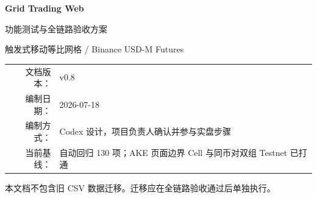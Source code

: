 \documentclass[11pt,a4paper,fontset=mac]{ctexart}
\begin{document}
\hypersetup{pageanchor=false}
\begin{titlepage}
  \centering
  \vspace*{3.5cm}
  {\Huge\bfseries Grid Trading Web\par}
  \vspace{0.7cm}
  {\LARGE 功能测试与全链路验收方案\par}
  \vspace{1.2cm}
  {\large 触发式移动等比网格 / Binance USD-M Futures\par}
  \vfill
  \begin{tabular}{rl}
    文档版本： & v0.8 \\
    编制日期： & 2026-07-18 \\
    编制方式： & Codex 设计，项目负责人确认并参与实盘步骤 \\
    当前基线： & 自动回归 130 项；AKE 页面边界 Cell 与同币对双组 Testnet 已打通 \\
  \end{tabular}
  \vfill
  {\small 本文档不包含旧 CSV 数据迁移。迁移应在全链路验收通过后单独执行。\par}
\end{titlepage}

\clearpage
\hypersetup{pageanchor=true}
\tableofcontents
\clearpage
{}















\end{document}
